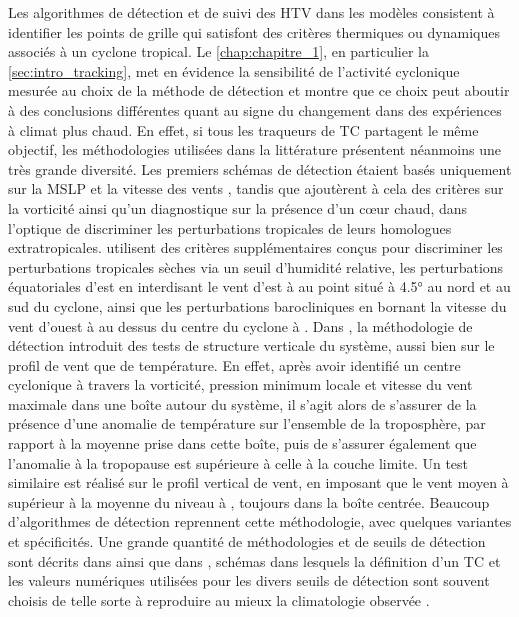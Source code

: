 \documentclass[../main.tex]{subfiles}
\begin{document}
Les algorithmes de détection et de suivi des HTV dans les modèles consistent à identifier les points de grille qui satisfont des critères thermiques ou
dynamiques associés à un cyclone tropical. Le \cref{chap:chapitre_1}, en particulier la \cref{sec:intro_tracking}, met en évidence la sensibilité de l'activité
cyclonique mesurée au choix de la méthode de détection et montre que ce choix peut aboutir à des conclusions différentes quant au signe du changement dans des
expériences à climat plus chaud. En effet, si tous les traqueurs de TC partagent le même objectif, les méthodologies utilisées dans la littérature présentent
néanmoins une très grande diversité. Les premiers schémas de détection étaient basés uniquement sur la MSLP et la vitesse des vents
\parencite{bengtsson_simulation_1982,broccoli_can_1990}, tandis que \textcite{haarsma_tropical_1993,bengtsson_hurricanetype_1995} ajoutèrent à cela des critères sur
la vorticité ainsi qu'un diagnostique sur la présence d'un cœur chaud, dans l'optique de discriminer les perturbations tropicales de leurs homologues
extratropicales. \textcite{wu_gcm_1992} utilisent des critères supplémentaires conçus pour discriminer les perturbations tropicales sèches via un seuil d'humidité
relative, les perturbations équatoriales d'est en interdisant le vent d'est à  au point situé à \ang{4.5} au nord et au sud du cyclone, ainsi que les
perturbations barocliniques en bornant la vitesse du vent d'ouest à  au dessus du centre du cyclone à . Dans \textcite{bengtsson_hurricanetype_1995},
la méthodologie de détection introduit des tests de structure verticale du système, aussi bien sur le profil de vent que de température. En effet, après avoir
identifié un centre cyclonique à travers la vorticité, pression minimum locale et vitesse du vent maximale dans une boîte autour du système, il s'agit alors de
s'assurer de la présence d'une anomalie de température sur l'ensemble de la troposphère, par rapport à la moyenne prise dans cette boîte, puis de s'assurer
également que l'anomalie à la tropopause est supérieure à celle à la couche limite. Un test similaire est réalisé sur le profil vertical de vent, en imposant
que le vent moyen à  supérieur à la moyenne du niveau à , toujours dans la boîte centrée. Beaucoup d'algorithmes de détection reprennent cette
méthodologie, avec quelques variantes et spécificités. Une grande quantité de méthodologies et de seuils de détection sont décrits dans
\textcite{walsh_objectively_2007} ainsi que dans \cite[][Annexe B]{ullrich_tempestextremes_2017}, schémas dans lesquels la définition d'un TC et les valeurs
numériques utilisées pour les divers seuils de détection sont souvent choisis de telle sorte à reproduire au mieux la climatologie observée
\parencite{walsh_objectively_2007,tory_development_2013}.
\end{document}
